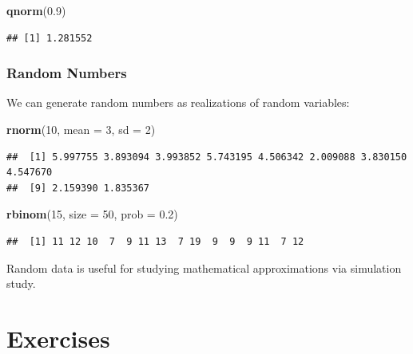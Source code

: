 \documentclass[
]{article}
\newenvironment{Shaded}{\begin{snugshade}}{\end{snugshade}}
\newcommand{\AttributeTok}[1]{\textcolor[rgb]{0.13,0.29,0.53}{#1}}
\newcommand{\DecValTok}[1]{\textcolor[rgb]{0.00,0.00,0.81}{#1}}
\newcommand{\FloatTok}[1]{\textcolor[rgb]{0.00,0.00,0.81}{#1}}
\newcommand{\FunctionTok}[1]{\textcolor[rgb]{0.13,0.29,0.53}{\textbf{#1}}}
\newcommand{\NormalTok}[1]{#1}
\begin{document}
\begin{Shaded}
\begin{Highlighting}[]
\FunctionTok{qnorm}\NormalTok{(}\FloatTok{0.9}\NormalTok{)}
\end{Highlighting}
\end{Shaded}

\begin{verbatim}
## [1] 1.281552
\end{verbatim}

\hypertarget{random-numbers}{%
\subsubsection{Random Numbers}\label{random-numbers}}

We can generate random numbers as realizations of random variables:

\begin{Shaded}
\begin{Highlighting}[]
\FunctionTok{rnorm}\NormalTok{(}\DecValTok{10}\NormalTok{, }\AttributeTok{mean =} \DecValTok{3}\NormalTok{, }\AttributeTok{sd =} \DecValTok{2}\NormalTok{)}
\end{Highlighting}
\end{Shaded}

\begin{verbatim}
##  [1] 5.997755 3.893094 3.993852 5.743195 4.506342 2.009088 3.830150 4.547670
##  [9] 2.159390 1.835367
\end{verbatim}

\begin{Shaded}
\begin{Highlighting}[]
\FunctionTok{rbinom}\NormalTok{(}\DecValTok{15}\NormalTok{, }\AttributeTok{size =} \DecValTok{50}\NormalTok{, }\AttributeTok{prob =} \FloatTok{0.2}\NormalTok{)}
\end{Highlighting}
\end{Shaded}

\begin{verbatim}
##  [1] 11 12 10  7  9 11 13  7 19  9  9  9 11  7 12
\end{verbatim}

Random data is useful for studying mathematical approximations via
simulation study.

\hypertarget{exercises}{%
\section{Exercises}\label{exercises}}
\end{document}
